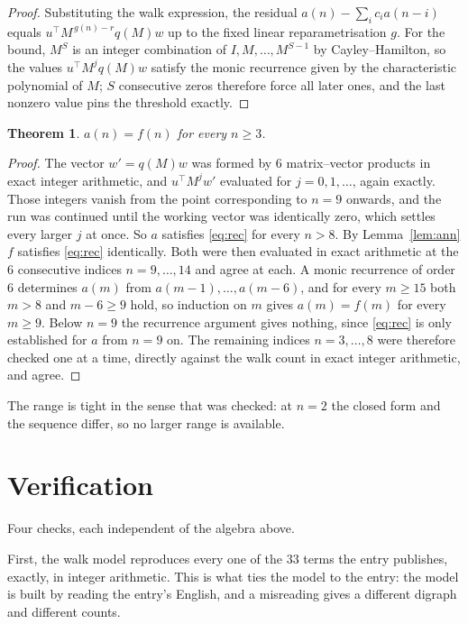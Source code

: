 \documentclass[11pt,a4paper]{article}
\theoremstyle{plain}
\newtheorem{theorem}{Theorem}
\theoremstyle{definition}
\begin{document}
\begin{proof}
Substituting the walk expression, the residual $a(n)-\sum_ic_ia(n-i)$ equals
$u^{\!\top}M^{\,g(n)-r}q(M)w$ up to the fixed linear reparametrisation $g$. For the bound,
$M^{S}$ is an integer combination of $I,M,\dots,M^{S-1}$ by Cayley--Hamilton, so the values
$u^{\!\top}M^{j}q(M)w$ satisfy the monic recurrence given by the characteristic polynomial of
$M$; $S$ consecutive zeros therefore force all later ones, and the last nonzero value pins the
threshold exactly.
\end{proof}

\begin{theorem}
$a(n)=f(n)$ for every $n\ge3$.
\end{theorem}

\begin{proof}
The vector $w'=q(M)w$ was formed by $6$ matrix--vector products in exact integer
arithmetic, and $u^{\!\top}M^{j}w'$ evaluated for $j=0,1,\dots$, again exactly. Those integers
vanish from the point corresponding to $n=9$ onwards, and the run was continued until the
working vector was identically zero, which settles every larger $j$ at once. So $a$ satisfies
\eqref{eq:rec} for every $n>8$. By Lemma~\ref{lem:ann} $f$ satisfies \eqref{eq:rec}
identically. Both were then evaluated in exact arithmetic at the $6$ consecutive indices
$n=9,\dots,14$ and agree at each. A monic recurrence of order $6$
determines $a(m)$ from $a(m-1),\dots,a(m-6)$, and for every $m\ge15$ both
$m>8$ and $m-6\ge9$ hold, so induction on $m$ gives $a(m)=f(m)$ for every
$m\ge9$.
Below $n=9$ the recurrence argument gives nothing, since \eqref{eq:rec} is only
established for $a$ from $n=9$ on. The remaining indices $n=3,\dots,8$ were
therefore checked one at a time, directly against the walk count in exact integer arithmetic,
and agree.
\end{proof}

The range is tight in the sense that was checked: at $n=2$ the closed form and the sequence differ, so no larger range is available.

\section{Verification}

Four checks, each independent of the algebra above.

First, the walk model reproduces every one of the $33$ terms the entry publishes,
exactly, in integer arithmetic. This is what ties the model to the entry: the model is built
by reading the entry's English, and a misreading gives a different digraph and different
counts.
\end{document}
